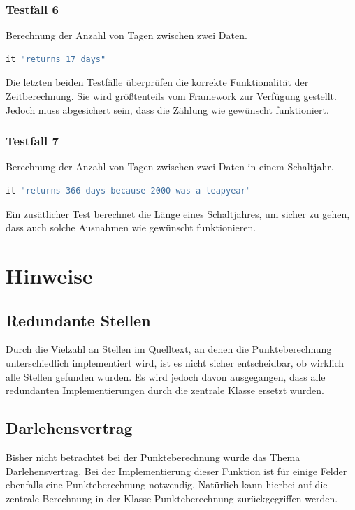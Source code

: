 \documentclass[12pt]{scrreprt}
\begin{document}
\subsubsection{Testfall 6}
Berechnung der Anzahl von Tagen zwischen zwei Daten.
\begin{lstlisting}[language=Ruby]
it "returns 17 days"
\end{lstlisting}
Die letzten beiden Testfälle überprüfen die korrekte Funktionalität der Zeitberechnung. Sie wird größtenteils vom Framework zur Verfügung gestellt. Jedoch muss abgesichert sein, dass die Zählung wie gewünscht funktioniert.

\subsubsection{Testfall 7}
Berechnung der Anzahl von Tagen zwischen zwei Daten in einem Schaltjahr.
\begin{lstlisting}[language=Ruby]
it "returns 366 days because 2000 was a leapyear"
\end{lstlisting}
Ein zusätlicher Test berechnet die Länge eines Schaltjahres, um sicher zu gehen, dass auch solche Ausnahmen wie gewünscht funktionieren.

\section{Hinweise}

\subsection{Redundante Stellen}
Durch die Vielzahl an Stellen im Quelltext, an denen die Punkteberechnung unterschiedlich implementiert wird, ist es nicht sicher entscheidbar, ob wirklich alle Stellen gefunden wurden. Es wird jedoch davon ausgegangen, dass alle redundanten Implementierungen durch die zentrale Klasse ersetzt wurden.

\subsection{Darlehensvertrag} 
Bisher nicht betrachtet bei der Punkteberechnung wurde das Thema Darlehensvertrag. Bei der Implementierung dieser Funktion ist für einige Felder ebenfalls eine Punkteberechnung notwendig. Natürlich kann hierbei auf die zentrale Berechnung in der Klasse Punkteberechnung zurückgegriffen werden.
\end{document}

